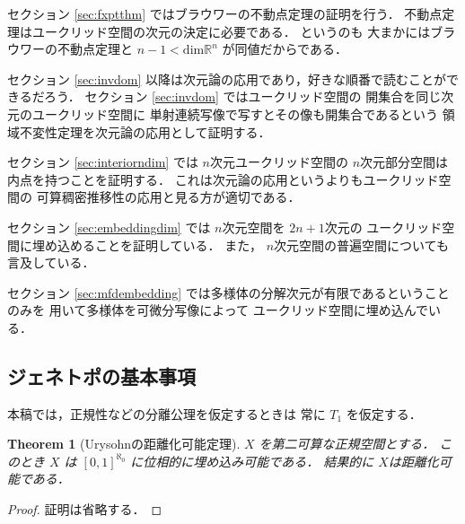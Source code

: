 \documentclass[leqno, a4paper, 12pt]{jsarticle}
\theoremstyle{plain}
\newtheorem{thm}{Theorem}[section]
\theoremstyle{definition}
\theoremstyle{remark}
\newcommand{\rr}{\mathbb{R}}
\newcommand{\yodim}{\mathrm{dim}}
\numberwithin{equation}{section}
\begin{document}
セクション
\ref{sec:fxptthm}
ではブラウワーの不動点定理の証明を行う．
不動点定理はユークリッド空間の次元の決定に必要である．
というのも
大まかにはブラウワーの不動点定理と
$n-1<\yodim \rr^{n}$
が同値だからである．

セクション
\ref{sec:invdom}
以降は次元論の応用であり，好きな順番で読むことができるだろう．
セクション
\ref{sec:invdom}
ではユークリッド空間の
開集合を同じ次元のユークリッド空間に
単射連続写像で写すとその像も開集合であるという
領域不変性定理を次元論の応用として証明する．

セクション
\ref{sec:interiorndim}
では
$n$次元ユークリッド空間の
$n$次元部分空間は内点を持つことを証明する．
これは次元論の応用というよりもユークリッド空間の
可算稠密推移性の応用と見る方が適切である．

セクション
\ref{sec:embeddingdim}
では
$n$次元空間を
$2n+1$次元の
ユークリッド空間に埋め込めることを証明している．
また，
$n$次元空間の普遍空間についても言及している．


セクション
\ref{sec:mfdembedding}
では多様体の分解次元が有限であるということのみを
用いて多様体を可微分写像によって
ユークリッド空間に埋め込んでいる．

\subsection{ジェネトポの基本事項}\label{subsec:genetop}

本稿では，正規性などの分離公理を仮定するときは
常に
$T_{1}$
を仮定する．

\begin{thm}[Urysohnの距離化可能定理]\label{thm:secpre:urysohnmet}
$X$
を第二可算な正規空間とする．
このとき
$X$
は
$[0, 1]^{\aleph_{0}}$
に位相的に埋め込み可能である．
結果的に
$X$は距離化可能である．
\end{thm}
\begin{proof}
証明は省略する．
\end{proof}
\end{document}
